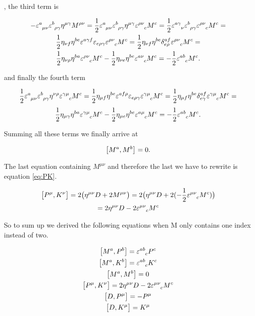 , the third term is

\begin{gather*}
    -\ep\ein{a}{\mu \nu} \ep\ein{b}{\rho \gamma}\eta^{\mu \gamma} M^{\rho \nu}=
    \frac{1}{2}\ep\ein{a}{\mu \nu} \ep\ein{b}{\rho \gamma}\eta^{\mu \gamma}\ep\ein{\rho \nu}{c} M^c=
    \frac{1}{2}\ep\ein{a \gamma}{\nu} \ep\ein{b}{\rho \gamma}\ep\ein{\rho \nu}{c}M^c=
    \\
    \frac{1}{2}\eta_{\nu f}\eta^{be}\ep^{a \gamma f} \ep_{e \rho \gamma}\ep\ein{\rho \nu}{c} M^c=\frac{1}{2}\eta_{\nu f}\eta^{be}\de^{a f}_{e \rho}\ep\ein{\rho \nu}{c} M^c=
    \\
    \frac{1}{2}\eta_{\nu \rho}\eta^{ba}\ep\ein{\rho \nu}{c} M^c-\frac{1}{2}\eta_{\nu e}\eta^{be} \ep\ein{a \nu}{c} M^c
    =-\frac{1}{2}\ep\ein{a b}{c} M^c.
\end{gather*}

and finally the fourth term

    $$
    \frac{1}{2}\ep\ein{a}{\mu \nu} \ep\ein{b}{\rho \gamma}\eta^{\nu \rho}\ep\ein{\gamma \mu}{c} M^c=
    \frac{1}{2}\eta_{\mu f}\eta^{b e}\ep^{af\rho}\ep_{e\rho\gamma}\ep\ein{\gamma \mu}{c} M^c=
    \frac{1}{2}\eta_{\mu f}\eta^{b e}\de_{e\gamma}^{af}\ep\ein{\gamma \mu}{c} M^c=
    $$
    $$
    \frac{1}{2}\eta_{\mu \gamma}\eta^{b a}\ep\ein{\gamma \mu}{c} M^c-\frac{1}{2}\eta_{\mu e}\eta^{b e}\ep\ein{a \mu}{c} M^c=-\frac{1}{2}\ep\ein{ab}{c}M^c.
    $$
    
Summing all these terms we finally arrive at

$$
\big[M^a, M^b\big]=0.
$$

The last equation containing $M^{\mu\nu}$ and therefore the last we have to rewrite is equation \ref{eq:PK}.

\begin{gather*}
    \big[P^{\mu}, K^\nu \big]=2 \big( \eta^{\mu \nu}D+ 2M^{\mu \nu}\big)=2 \big( \eta^{\mu \nu}D+2(-\frac{1}{2}\ep\ein{\mu \nu}{c}M^c) \big)
    \\
    =2 \eta^{\mu \nu}D-2 \ep\ein{\mu \nu}{c}M^c
\end{gather*}


So to sum up we derived the following equations when M only contains one index instead of two. 


\begin{gather*}
    \big[M^{a}, P^b \big]=\ep\ein{a b}{c}P^c
    \\
    \big[M^{a}, K^b \big]=\ep\ein{a b}{c}K^c\\
    \big[M^{a}, M^{b} \big]=0
    \\
    \big[P^{\mu}, K^\nu \big]=2 \eta^{\mu \nu}D-2 \ep\ein{\mu \nu}{c}M^c\\
    \big[D, P^\mu \big]=-P^\mu 
    \\
    \big[D, K^\mu \big]=K^\mu
\end{gather*}